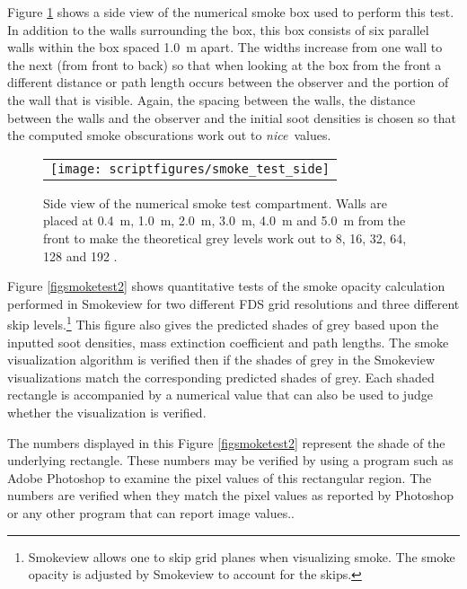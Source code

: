 \documentclass[11pt,twoside]{book}
\newcommand{\figoptions}{hbp}
\begin{document}
Figure \ref{figsmoketestgeom} shows a side view of the numerical smoke box used to perform this test.  In addition to the walls surrounding the box, this box consists of  six parallel walls within the box spaced 1.0~m apart.  The widths increase from one wall to the next (from front to back) so that when looking at the box from the front a different distance or path length occurs between the observer and the portion of the wall that is visible.  Again, the spacing between the walls, the distance between the walls and the observer and the initial soot densities is chosen so that the computed smoke obscurations work out to {\em nice}\ values.

\begin{figure}[\figoptions]
\begin{center}
 \centering
\begin{tabular}{c}
 \texttt{[image: scriptfigures/smoke\_test\_side]}
 \end{tabular}
\end{center}
 \caption[Side view of numerical smoke test compartment.]{Side view of the numerical smoke test compartment.  Walls are placed at 0.4~m, 1.0~m, 2.0~m, 3.0~m, 4.0~m and 5.0~m from the front to make the theoretical grey levels work out to 8, 16, 32, 64, 128 and 192 .}
\label{figsmoketestgeom}%
\end{figure}

Figure \ref{figsmoketest2} shows quantitative tests of the smoke opacity calculation performed in Smokeview for two different FDS grid resolutions and three different skip levels.\footnote{Smokeview allows one to skip grid planes when visualizing smoke.  The smoke opacity is adjusted by Smokeview to account for the skips.} This figure also gives the predicted shades of grey based upon the inputted soot densities, mass extinction coefficient and path lengths.  The smoke visualization algorithm is verified then if the shades of grey in the Smokeview visualizations match the corresponding predicted shades of grey.  Each shaded
rectangle is accompanied by a numerical value that can also be used to judge whether the visualization is verified.

The numbers displayed in this Figure \ref{figsmoketest2} represent the shade of the underlying rectangle.  These numbers may be verified by using a program such as Adobe Photoshop to examine the pixel values of this rectangular region.  The numbers are verified when they match the pixel values as reported by Photoshop or any other program that can report image values..
\end{document}

